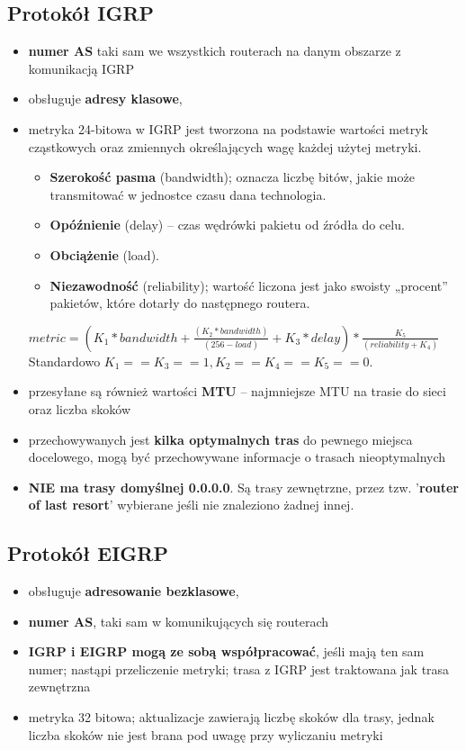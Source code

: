 \documentclass[../main.tex]{subfiles}
\begin{document}
    \subsection{Protokół IGRP}
    \begin{itemize}
        \item \textbf{numer AS} taki sam
        we wszystkich routerach na danym obszarze z komunikacją IGRP
        \item obsługuje \textbf{adresy klasowe},
        \item metryka 24-bitowa w IGRP jest tworzona na podstawie wartości metryk cząstkowych oraz zmiennych
        określających wagę każdej użytej metryki.
        \begin{itemize}
            \item \textbf{Szerokość pasma} (bandwidth); oznacza liczbę bitów, jakie może transmitować w
            jednostce czasu dana technologia.
            \item \textbf{Opóźnienie} (delay) – czas wędrówki pakietu od źródła do celu.
            \item \textbf{Obciążenie} (load).
            \item \textbf{Niezawodność} (reliability); wartość liczona jest jako swoisty
            „procent” pakietów, które dotarły do następnego routera.
        \end{itemize}
        $metric = (K_1 * bandwidth + \frac{(K_2*bandwidth)}{(256 - load)} + K_3 * delay) *
        \frac{K_5}{(reliability + K_4)}$
        Standardowo $K_1 == K_3 == 1, K_2 == K_4 == K_5 == 0$.
        \item przesyłane są również wartości \textbf{MTU} – najmniejsze MTU na trasie do sieci oraz liczba skoków
        \item przechowywanych jest \textbf{kilka optymalnych tras} do pewnego miejsca docelowego, mogą być przechowywane informacje o trasach nieoptymalnych
        \item \textbf{NIE ma trasy domyślnej 0.0.0.0}. Są trasy zewnętrzne, przez tzw. '\textbf{router of last resort}'
        wybierane jeśli nie znaleziono żadnej innej.
    \end{itemize}

    \subsection{Protokół EIGRP}
    \begin{itemize}
        \item obsługuje \textbf{adresowanie bezklasowe},
        \item \textbf{numer AS}, taki sam w komunikujących
        się routerach
        \item \textbf{IGRP i EIGRP mogą ze sobą współpracować}, jeśli mają ten sam numer; nastąpi przeliczenie metryki;
        trasa z IGRP jest traktowana jak trasa zewnętrzna
        \item metryka 32 bitowa; aktualizacje zawierają liczbę skoków dla
        trasy, jednak liczba skoków nie jest brana pod uwagę przy wyliczaniu metryki
    \end{itemize}
\end{document}
